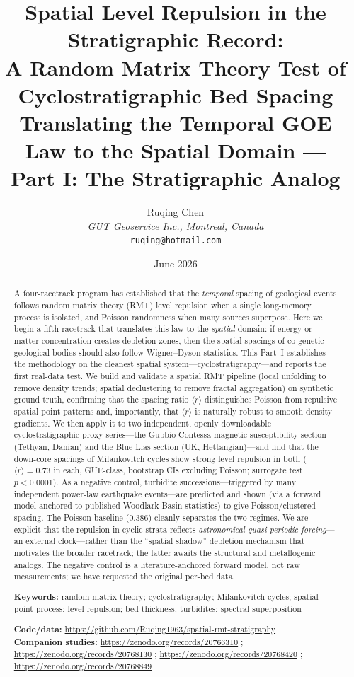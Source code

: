 \documentclass[12pt,a4paper]{article}
\title{\textbf{Spatial Level Repulsion in the Stratigraphic Record:\\
A Random Matrix Theory Test of Cyclostratigraphic Bed Spacing}\\[4pt]
\large Translating the Temporal GOE Law to the Spatial Domain ---\\
Part I: The Stratigraphic Analog}
\author{Ruqing Chen\\
\textit{GUT Geoservice Inc., Montreal, Canada}\\
\texttt{ruqing@hotmail.com}}
\date{June 2026}
\begin{document}
\maketitle

\begin{abstract}
A four-racetrack program has established that the \emph{temporal} spacing of geological events follows random matrix theory (RMT) level repulsion when a single long-memory process is isolated, and Poisson randomness when many sources superpose. Here we begin a fifth racetrack that translates this law to the \emph{spatial} domain: if energy or matter concentration creates depletion zones, then the spatial spacings of co-genetic geological bodies should also follow Wigner--Dyson statistics. This Part~I establishes the methodology on the cleanest spatial system---cyclostratigraphy---and reports the first real-data test. We build and validate a spatial RMT pipeline (local unfolding to remove density trends; spatial declustering to remove fractal aggregation) on synthetic ground truth, confirming that the spacing ratio $\langle r\rangle$ distinguishes Poisson from repulsive spatial point patterns and, importantly, that $\langle r\rangle$ is naturally robust to smooth density gradients. We then apply it to two independent, openly downloadable cyclostratigraphic proxy series---the Gubbio Contessa magnetic-susceptibility section (Tethyan, Danian) and the Blue Lias section (UK, Hettangian)---and find that the down-core spacings of Milankovitch cycles show strong level repulsion in both ($\langle r\rangle=0.73$ in each, GUE-class, bootstrap CIs excluding Poisson; surrogate test $p<0.0001$). As a negative control, turbidite successions---triggered by many independent power-law earthquake events---are predicted and shown (via a forward model anchored to published Woodlark Basin statistics) to give Poisson/clustered spacing. The Poisson baseline (0.386) cleanly separates the two regimes. We are explicit that the repulsion in cyclic strata reflects \emph{astronomical quasi-periodic forcing}---an external clock---rather than the ``spatial shadow'' depletion mechanism that motivates the broader racetrack; the latter awaits the structural and metallogenic analogs. The negative control is a literature-anchored forward model, not raw measurements; we have requested the original per-bed data.

\medskip
\noindent\textbf{Keywords:} random matrix theory; cyclostratigraphy; Milankovitch cycles; spatial point process; level repulsion; bed thickness; turbidites; spectral superposition

\medskip
\noindent\textbf{Code/data:} \url{https://github.com/Ruqing1963/spatial-rmt-stratigraphy}\\
\textbf{Companion studies:} \url{https://zenodo.org/records/20766310} ; \url{https://zenodo.org/records/20768130} ; \url{https://zenodo.org/records/20768420} ; \url{https://zenodo.org/records/20768849}
\end{abstract}
\end{document}
